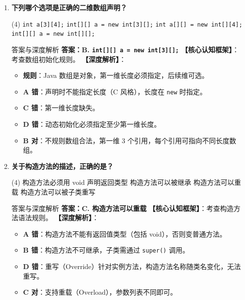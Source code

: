 \documentclass[12pt, a4paper]{ctexart}
\newcommand{\code}[1]{\texttt{#1}}
\begin{document}
\begin{enumerate}[label=\textbf{\arabic*.}, leftmargin=*, itemsep=1.5em]
\item \textbf{下列哪个选项是正确的二维数组声明？}
\begin{tasks}(4)
    \task \code{int a[3][4];} \task \code{int[][] a = new int[3][];}
    \task \code{int a[][] = new int[][4];} \task \code{int[][] a = new int[][];}
\end{tasks}
\begin{bluebox}{答案与深度解析}
\textbf{答案：B. \code{int[][] a = new int[3][];}}
\textbf{【核心认知框架】}：考查数组初始化规则。
\textbf{【深度解析】}：
\begin{itemize}[leftmargin=*, nosep]
    \item \textbf{规则}：Java 数组是对象，第一维长度必须指定，后续维可选。
    \item \textbf{A 错}：声明时不能指定长度（C 风格），长度在 \code{new} 时指定。
    \item \textbf{C 错}：第一维长度缺失。
    \item \textbf{D 错}：动态初始化必须指定至少第一维长度。
    \item \textbf{B 对}：不规则数组合法，第一维 3 个引用，每个引用可指向不同长度数组。
\end{itemize}
\end{bluebox}

\item \textbf{关于构造方法的描述，正确的是？}
\begin{tasks}(4)
    \task 构造方法必须用 void 声明返回类型 \task 构造方法可以被继承
    \task 构造方法可以重载 \task 构造方法可以被子类重写
\end{tasks}
\begin{bluebox}{答案与深度解析}
\textbf{答案：C. 构造方法可以重载}
\textbf{【核心认知框架】}：考查构造方法语法规则。
\textbf{【深度解析】}：
\begin{itemize}[leftmargin=*, nosep]
    \item \textbf{A 错}：构造方法不能有返回值类型（包括 void），否则变普通方法。
    \item \textbf{B 错}：构造方法不可继承，子类需通过 \code{super()} 调用。
    \item \textbf{D 错}：重写（Override）针对实例方法，构造方法名称随类名变化，无法重写。
    \item \textbf{C 对}：支持重载（Overload），参数列表不同即可。
\end{itemize}
\end{bluebox}


\end{enumerate}
\end{document}

